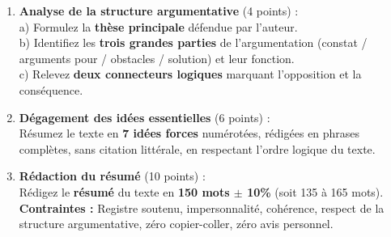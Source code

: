\documentclass[11pt]{article}
\begin{document}
\begin{exercice}
\begin{enumerate}
    \item \textbf{Analyse de la structure argumentative} (4 points) :\\
    a) Formulez la \textbf{thèse principale} défendue par l'auteur.\\
    b) Identifiez les \textbf{trois grandes parties} de l'argumentation (constat / arguments pour / obstacles / solution) et leur fonction.\\
    c) Relevez \textbf{deux connecteurs logiques} marquant l'opposition et la conséquence.
    \item \textbf{Dégagement des idées essentielles} (6 points) :\\
    Résumez le texte en \textbf{7 idées forces} numérotées, rédigées en phrases complètes, sans citation littérale, en respectant l'ordre logique du texte.
    \item \textbf{Rédaction du résumé} (10 points) :\\
    Rédigez le \textbf{résumé} du texte en \textbf{150 mots $\pm$ 10\%} (soit 135 à 165 mots).\\
    \textbf{Contraintes :} Registre soutenu, impersonnalité, cohérence, respect de la structure argumentative, zéro copier-coller, zéro avis personnel.
\end{enumerate}
\end{exercice}
\end{document}
